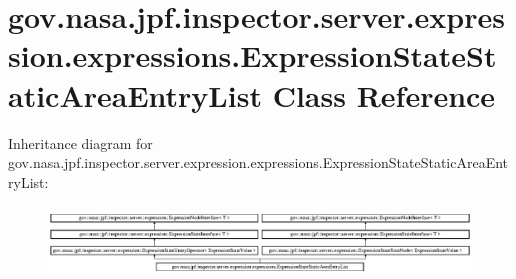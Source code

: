 \hypertarget{classgov_1_1nasa_1_1jpf_1_1inspector_1_1server_1_1expression_1_1expressions_1_1_expression_state_static_area_entry_list}{}\section{gov.\+nasa.\+jpf.\+inspector.\+server.\+expression.\+expressions.\+Expression\+State\+Static\+Area\+Entry\+List Class Reference}
\label{classgov_1_1nasa_1_1jpf_1_1inspector_1_1server_1_1expression_1_1expressions_1_1_expression_state_static_area_entry_list}
Inheritance diagram for gov.\+nasa.\+jpf.\+inspector.\+server.\+expression.\+expressions.\+Expression\+State\+Static\+Area\+Entry\+List\+:\begin{figure}[H]
\begin{center}
\leavevmode
\includegraphics[height=1.898305cm]{classgov_1_1nasa_1_1jpf_1_1inspector_1_1server_1_1expression_1_1expressions_1_1_expression_state_static_area_entry_list}
\end{center}
\end{figure}
